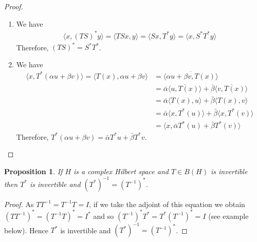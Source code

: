 \documentclass{report}
\newtheorem{prop}{Proposition}
\begin{document}
\begin{proof}
\begin{enumerate}
$$\begin{aligned}
                                                                                                                                 &= \langle x,\bar{\alpha}T^{*}y\rangle
      \end{aligned}
      $$
      Therefore, $(\alpha T)^{*} = \bar{\alpha}T^{*}$.
    \item We have
      $$
      \begin{aligned}
        \langle x,(TS)^{*}y\rangle = \langle TSx,y\rangle = \langle Sx,T^{*}y\rangle = \langle x,S^{*}T^{*}y\rangle
      \end{aligned}
      $$
      Therefore, $(TS)^{*} = S^{*}T^{*}$.
    \item We have
      $$
      \begin{aligned}
        \langle x,T^{*}(\alpha u+\beta v)\rangle = \langle T(x), \alpha u+\beta v\rangle &= \overline{\langle \alpha u+\beta v, T(x)\rangle} \\
                                                                                         &= \bar{\alpha}\overline{\langle u,T(x)\rangle}+\bar{\beta}\overline{\langle v,T(x)\rangle} \\
                                                                                         &= \bar{\alpha}\langle T(x),u\rangle+\bar{\beta}\langle T(x),v\rangle \\
                                                                                         &= \bar{\alpha}\langle x,T^{*}(u)\rangle+\bar{\beta}\langle x,T^{*}(v)\rangle \\
                                                                                         &= \langle x,\bar{\alpha}T^{*}(u)+\bar{\beta}T^{*}(v)\rangle
      \end{aligned}
      $$
      Therefore, $T^{*}(\alpha u+\beta v) = \bar{\alpha} T^{*}u+\bar{\beta} T^{*}v$.
  \end{enumerate}
\end{proof}

\begin{prop}
If $H$ is a complex Hilbert space and $T \in B(H)$ is invertible then $T^*$ is invertible and $(T^*)^{-1} = (T^{-1})^*$.
\end{prop}

\begin{proof}
As $TT^{-1} = T^{-1}T = I$, if we take the adjoint of this equation we obtain $(TT^{-1})^* = (T^{-1}T)^* = I^*$ and so $(T^{-1})^*T^* = T^*(T^{-1})^* = I$ (see example below). Hence $T^*$ is invertible and $(T^*)^{-1} = (T^{-1})^*$.
\end{proof}
\end{document}
